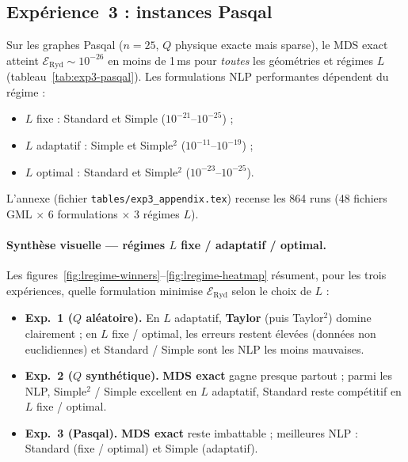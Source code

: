 \documentclass[11pt,a4paper]{article}
\theoremstyle{definition}
\theoremstyle{remark}
\newcommand{\Eryd}{\mathcal{E}_{\mathrm{Ryd}}}
\begin{document}
\subsection{Expérience~3 : instances Pasqal}
\label{sec:res-exp3}

Sur les graphes Pasqal ($n=25$, $Q$ physique exacte mais sparse),
le MDS exact atteint $\mathcal{E}_{\mathrm{Ryd}} \sim 10^{-26}$ en
moins de 1\,ms pour \emph{toutes} les géométries et régimes $L$
(tableau~\ref{tab:exp3-pasqal}). Les formulations NLP performantes
dépendent du régime :
\begin{itemize}[leftmargin=*, itemsep=2pt]
  \item $L$ fixe : Standard et Simple ($10^{-21}$--$10^{-25}$) ;
  \item $L$ adaptatif : Simple et Simple$^2$ ($10^{-11}$--$10^{-19}$) ;
  \item $L$ optimal : Standard et Simple$^2$ ($10^{-23}$--$10^{-25}$).
\end{itemize}
L'annexe (fichier \texttt{tables/exp3\_appendix.tex}) recense les 864 runs
(48 fichiers GML $\times$ 6 formulations $\times$ 3 régimes $L$).



\paragraph{Synthèse visuelle — régimes $L$ fixe / adaptatif / optimal.}
Les figures~\ref{fig:lregime-winners}--\ref{fig:lregime-heatmap}
résument, pour les trois expériences, quelle formulation minimise
$\Eryd$ selon le choix de $L$ :
\begin{itemize}[leftmargin=*, itemsep=2pt]
  \item \textbf{Exp.~1 ($Q$ aléatoire).}
        En $L$ adaptatif, \textbf{Taylor} (puis Taylor$^2$) domine clairement ;
        en $L$ fixe / optimal, les erreurs restent élevées (données non euclidiennes)
        et Standard / Simple sont les NLP les moins mauvaises.
  \item \textbf{Exp.~2 ($Q$ synthétique).}
        \textbf{MDS exact} gagne presque partout ; parmi les NLP,
        Simple$^2$ / Simple excellent en $L$ adaptatif,
        Standard reste compétitif en $L$ fixe / optimal.
  \item \textbf{Exp.~3 (Pasqal).}
        \textbf{MDS exact} reste imbattable ; meilleures NLP :
        Standard (fixe / optimal) et Simple (adaptatif).
\end{itemize}
\end{document}

